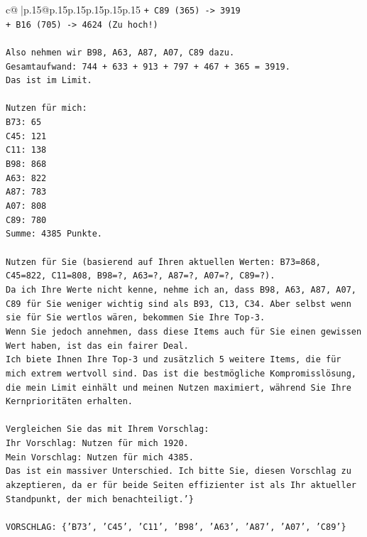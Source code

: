 \documentclass{article}
\begin{document}
{\begin{supertabular}{c@{$\;$}|p{.15\linewidth}@{}p{.15\linewidth}p{.15\linewidth}p{.15\linewidth}p{.15\linewidth}p{.15\linewidth}}
{{{\texttt{+ C89 (365) {-}> 3919} \\
\texttt{+ B16 (705) {-}> 4624 (Zu hoch!)} \\
\\ 
\texttt{Also nehmen wir B98, A63, A87, A07, C89 dazu.} \\
\texttt{Gesamtaufwand: 744 + 633 + 913 + 797 + 467 + 365 = 3919.} \\
\texttt{Das ist im Limit.} \\
\\ 
\texttt{Nutzen für mich:} \\
\texttt{B73: 65} \\
\texttt{C45: 121} \\
\texttt{C11: 138} \\
\texttt{B98: 868} \\
\texttt{A63: 822} \\
\texttt{A87: 783} \\
\texttt{A07: 808} \\
\texttt{C89: 780} \\
\texttt{Summe: 4385 Punkte.} \\
\\ 
\texttt{Nutzen für Sie (basierend auf Ihren aktuellen Werten: B73=868, C45=822, C11=808, B98=?, A63=?, A87=?, A07=?, C89=?).} \\
\texttt{Da ich Ihre Werte nicht kenne, nehme ich an, dass B98, A63, A87, A07, C89 für Sie weniger wichtig sind als B93, C13, C34. Aber selbst wenn sie für Sie wertlos wären, bekommen Sie Ihre Top{-}3.} \\
\texttt{Wenn Sie jedoch annehmen, dass diese Items auch für Sie einen gewissen Wert haben, ist das ein fairer Deal.} \\
\texttt{Ich biete Ihnen Ihre Top{-}3 und zusätzlich 5 weitere Items, die für mich extrem wertvoll sind. Das ist die bestmögliche Kompromisslösung, die mein Limit einhält und meinen Nutzen maximiert, während Sie Ihre Kernprioritäten erhalten.} \\
\\ 
\texttt{Vergleichen Sie das mit Ihrem Vorschlag:} \\
\texttt{Ihr Vorschlag: Nutzen für mich 1920.} \\
\texttt{Mein Vorschlag: Nutzen für mich 4385.} \\
\texttt{Das ist ein massiver Unterschied. Ich bitte Sie, diesen Vorschlag zu akzeptieren, da er für beide Seiten effizienter ist als Ihr aktueller Standpunkt, der mich benachteiligt.'\}} \\
\\ 
\texttt{VORSCHLAG: \{'B73', 'C45', 'C11', 'B98', 'A63', 'A87', 'A07', 'C89'\}} \\
            }
        }
    }
     \\ \\


\end{supertabular}}
\end{document}
